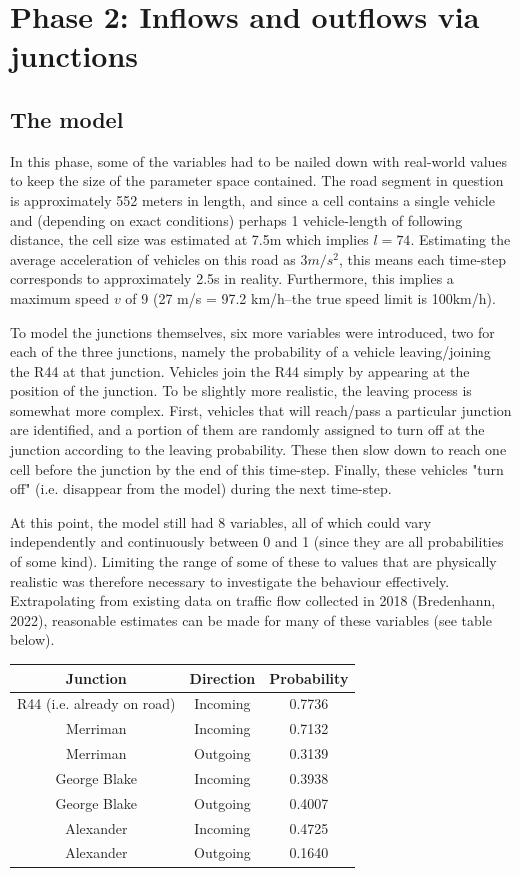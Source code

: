 \documentclass{article}
\begin{document}
\section*{Phase 2: Inflows and outflows via junctions}

\subsection*{The model}

In this phase, some of the variables had to be nailed down with real-world values to keep the size of the parameter space contained. The road segment in question is approximately 552 meters in length, and since a cell contains a single vehicle and (depending on exact conditions) perhaps 1 vehicle-length of following distance, the cell size was estimated at 7.5m which implies $l=74$. Estimating the average acceleration of vehicles on this road as $3m/s^{2}$, this means each time-step corresponds to approximately 2.5s in reality. Furthermore, this implies a maximum speed $v$ of 9 (27 m/s = 97.2 km/h--the true speed limit is 100km/h).

To model the junctions themselves, six more variables were introduced, two for each of the three junctions, namely the probability of a vehicle leaving/joining the R44 at that junction. Vehicles join the R44 simply by appearing at the position of the junction. To be slightly more realistic, the leaving process is somewhat more complex. First, vehicles that will reach/pass a particular junction are identified, and a portion of them are randomly assigned to turn off at the junction according to the leaving probability. These then slow down to reach one cell before the junction by the end of this time-step. Finally, these vehicles "turn off" (i.e. disappear from the model) during the next time-step.

At this point, the model still had 8 variables, all of which could vary independently and continuously between 0 and 1 (since they are all probabilities of some kind). Limiting the range of some of these to values that are physically realistic was therefore necessary to investigate the behaviour effectively. Extrapolating from existing data on traffic flow collected in 2018 (Bredenhann, 2022), reasonable estimates can be made for many of these variables (see table below).

\begin{center}
\begin{tabular}{ |c|c|c| }
 \hline
 Junction & Direction & Probability \\
 \hline
 R44 (i.e. already on road) & Incoming & 0.7736\\
 Merriman & Incoming & 0.7132 \\
 Merriman & Outgoing & 0.3139 \\
 George Blake & Incoming & 0.3938 \\
 George Blake & Outgoing & 0.4007 \\
 Alexander & Incoming & 0.4725 \\
 Alexander & Outgoing & 0.1640 \\
 \hline
\end{tabular}
\end{center}
\end{document}

